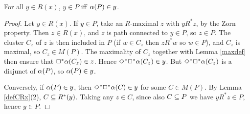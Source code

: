\begin{lemma} \label{defP}
For all $y\in R(x)$,  $y\in P$ iff\/ $\alpha(P)\in y$.
\end{lemma}
\begin{proof}
Let $y\in R(x)$.  If $y\in P$, take an $R$-maximal $z$ with $yR^*z$, by the Zorn property. Then $z\in R(x)$, and $z$ is path connected to $y\in P$, so $z\in P$. The  cluster $C_z$ of $z$ is then included in $P$ (if $w\in C_z$ then $zR^*w$ so $w\in P$), and $C_z$ is maximal, so $C_z\in M(P)$. The maximality of $C_z$ together with Lemma \ref{maxdef} then ensure that $\Box^*\alpha(C_z)\in z$. Hence  $\Diamond^*\Box^*\alpha(C_z)\in y$. But $\Diamond^*\Box^*\alpha(C_z)$ is a disjunct of $\alpha(P)$, so $\alpha(P)\in y$.

Conversely, if $\alpha(P)\in y$, then  $\Diamond^*\Box^*\alpha(C)\in y$ for some $C\in M(P)$. By Lemma \ref{defCRx}(2), $C\subseteq R^*(y)$. Taking any $z\in C$, since also $C\subseteq P$ we have $yR^*z\in P$, hence $y\in P$.
\end{proof}

